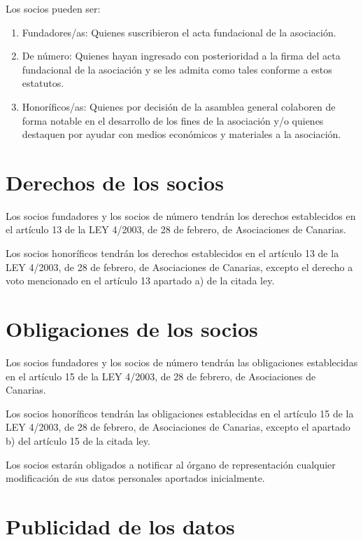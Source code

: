 \documentclass[a4paper, 12pt, oneside]{book}
\begin{document}
Los socios pueden ser:

\begin{enumerate}
    \item Fundadores/as: Quienes suscribieron el acta fundacional de la asociación.
    \item De número: Quienes hayan ingresado con posterioridad a la firma del acta fundacional de la asociación y se les admita como tales conforme a estos estatutos.
    \item Honoríficos/as: Quienes por decisión de la asamblea general colaboren de forma notable en el desarrollo de los fines de la asociación y/o quienes destaquen por ayudar con medios económicos y materiales a la asociación.
\end{enumerate}

\section{Derechos de los socios}

Los socios fundadores y los socios de número tendrán los derechos establecidos en el artículo 13 de la LEY 4/2003, de 28 de febrero, de Asociaciones de Canarias.

Los socios honoríficos tendrán los derechos establecidos en el artículo 13 de la LEY 4/2003, de 28 de febrero, de Asociaciones de Canarias, excepto el derecho a voto mencionado en el artículo 13 apartado a) de la citada ley.

\section{Obligaciones de los socios}

Los socios fundadores y los socios de número tendrán las obligaciones establecidas en el artículo 15 de la LEY 4/2003, de 28 de febrero, de Asociaciones de Canarias.

Los socios honoríficos tendrán las obligaciones establecidas en el artículo 15 de la LEY 4/2003, de 28 de febrero, de Asociaciones de Canarias, excepto el apartado b) del artículo 15 de la citada ley.

Los socios estarán obligados a notificar al órgano de representación cualquier modificación de sus datos personales aportados inicialmente.

\section{Publicidad de los datos}
\end{document}
